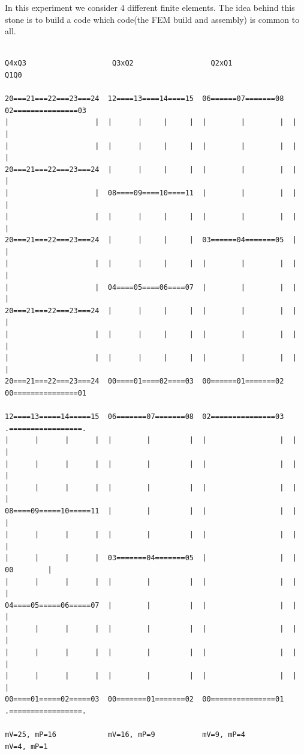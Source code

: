 In this experiment we consider 4 different finite elements. The idea behind this stone 
is to build a code which code(the FEM build and assembly) is common to all. 

\begin{verbatim}

Q4xQ3                    Q3xQ2                  Q2xQ1                 Q1Q0

20===21===22===23===24  12====13====14====15  06======07=======08  02===============03
|                    |  |      |     |     |  |        |        |  |                 |
|                    |  |      |     |     |  |        |        |  |                 |
20===21===22===23===24  |      |     |     |  |        |        |  |                 |
|                    |  08====09====10====11  |        |        |  |                 |
|                    |  |      |     |     |  |        |        |  |                 |
20===21===22===23===24  |      |     |     |  03======04=======05  |                 |
|                    |  |      |     |     |  |        |        |  |                 |
|                    |  04====05====06====07  |        |        |  |                 |
20===21===22===23===24  |      |     |     |  |        |        |  |                 |
|                    |  |      |     |     |  |        |        |  |                 |
|                    |  |      |     |     |  |        |        |  |                 |
20===21===22===23===24  00====01====02====03  00======01=======02  00===============01 

12====13=====14=====15  06=======07=======08  02===============03  .=================.
|      |      |      |  |        |         |  |                 |  |                 |
|      |      |      |  |        |         |  |                 |  |                 |
|      |      |      |  |        |         |  |                 |  |                 |
08====09=====10=====11  |        |         |  |                 |  |                 |
|      |      |      |  |        |         |  |                 |  |                 |
|      |      |      |  03=======04=======05  |                 |  |       00        |
|      |      |      |  |        |         |  |                 |  |                 |
04====05=====06=====07  |        |         |  |                 |  |                 |
|      |      |      |  |        |         |  |                 |  |                 |
|      |      |      |  |        |         |  |                 |  |                 |
|      |      |      |  |        |         |  |                 |  |                 |
00====01=====02=====03  00=======01=======02  00===============01  .=================.

mV=25, mP=16            mV=16, mP=9           mV=9, mP=4           mV=4, mP=1      

\end{verbatim}

